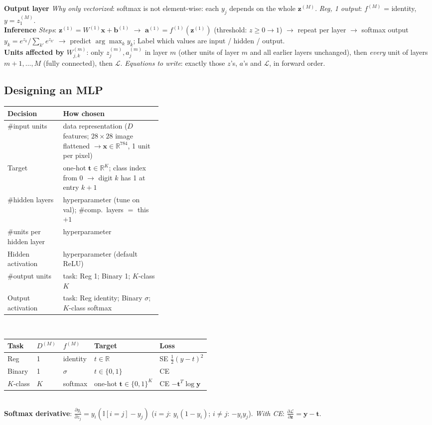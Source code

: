 \documentclass[10pt]{article}
\newcommand{\ind}{\mathbb{I}}
\newcommand{\vx}{\mathbf{x}}
\newcommand{\vt}{\mathbf{t}}
\newcommand{\cL}{\mathcal{L}}
\newcommand{\sub}[1]{\textit{#1}:}  %
\newcommand{\va}{\mathbf{a}}
\newcommand{\vb}{\mathbf{b}}
\newcommand{\vz}{\mathbf{z}}
\newcommand{\vy}{\mathbf{y}}
\begin{document}
\begin{multicols*}{3}
\textbf{Output layer} \sub{Why only vectorized} softmax is not element-wise: each $y_j$ depends on the whole $\vz^{(M)}$. \sub{Reg, 1 output} $f^{(M)}$ = identity, $y=z^{(M)}_1$.\\
\textbf{Inference} \sub{Steps} $\vz^{(1)}=W^{(1)}\vx+\vb^{(1)}$ $\to$ $\va^{(1)}=f^{(1)}(\vz^{(1)})$ (threshold: $z\ge0\to1$) $\to$ repeat per layer $\to$ softmax output $y_k=e^{z_k}/\sum_{k'}e^{z_{k'}}$ $\to$ predict $\arg\max_k y_k$; Label which values are input / hidden / output.\\
\textbf{Units affected by $W^{(m)}_{j,k}$}: only $z^{(m)}_j,a^{(m)}_j$ in layer $m$ (other units of layer $m$ and all earlier layers unchanged), then \emph{every} unit of layers $m\!+\!1,\dots,M$ (fully connected), then $\cL$. \sub{Equations to write} exactly those $z$'s, $a$'s and $\cL$, in forward order.

\subsection{Designing an MLP}
{\fontsize{4}{4.7}\selectfont\setlength{\tabcolsep}{2pt}\renewcommand{\arraystretch}{0.95}%
\begin{tabularx}{\linewidth}{@{}>{\raggedright\arraybackslash}p{0.36\linewidth}>{\raggedright\arraybackslash}X@{}}
\textbf{Decision} & \textbf{How chosen}\\\hline
\#input units & data representation ($D$ features; $28\times28$ image flattened $\to\vx\in\mathbb R^{784}$, 1 unit per pixel)\\
Target & one-hot $\vt\in\mathbb R^{K}$; class index from 0 $\to$ digit $k$ has 1 at entry $k\!+\!1$\\
\#hidden layers & hyperparameter (tune on val); \#comp.\ layers $=$ this $+1$\\
\#units per hidden layer & hyperparameter\\
Hidden activation & hyperparameter (default ReLU)\\
\#output units & task: Reg 1; Binary 1; $K$-class $K$\\
Output activation & task: Reg identity; Binary $\sigma$; $K$-class softmax
\end{tabularx}}\\[1pt]
{\fontsize{4}{4.7}\selectfont\setlength{\tabcolsep}{2pt}\renewcommand{\arraystretch}{0.95}%
\begin{tabularx}{\linewidth}{@{}lll>{\raggedright\arraybackslash}X>{\raggedright\arraybackslash}X@{}}
\textbf{Task} & $D^{(M)}$ & $f^{(M)}$ & \textbf{Target} & \textbf{Loss}\\\hline
Reg & 1 & identity & $t\in\mathbb R$ & SE $\frac12(y-t)^2$\\
Binary & 1 & $\sigma$ & $t\in\{0,1\}$ & CE\\
$K$-class & $K$ & softmax & one-hot $\vt\in\{0,1\}^K$ & CE $-\vt^T\log\vy$
\end{tabularx}}\\
\textbf{Softmax derivative}: $\frac{\partial y_i}{\partial z_j}=y_i(\ind[i=j]-y_j)$ ($i=j$: $y_i(1-y_i)$; $i\ne j$: $-y_iy_j$). \sub{With CE} $\frac{\partial\cL}{\partial\vz}=\vy-\vt$.


\end{multicols*}
\end{document}
